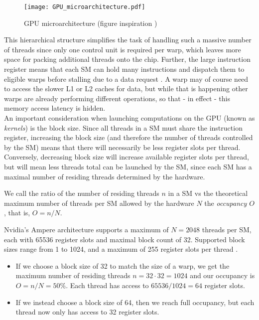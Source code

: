 \begin{figure}[ht]
    \centering
    \texttt{[image: GPU\_microarchitecture.pdf]}
    \caption{GPU microarchitecture (figure inspiration \cite*{solvercomp})}
    \label{fig:gpu}
\end{figure}

This hierarchical structure simplifies the task of handling such a massive number of 
threads since only one control unit is required per warp, which leaves more space for 
packing additional threads onto the chip. Further, the large instruction register means 
that each SM can hold many instructions and dispatch them to eligible warps before 
stalling due to a data request \cite*{solvercomp}. A warp may of course need to access 
the slower L1 or L2 caches for data, but while that is happening other warps are already 
performing different operations, so that - in effect - this memory access latency is 
hidden. \\

An important consideration when launching computations on the GPU (known as \emph{kernels}) 
is the block size. Since all threads in a SM must share the instruction register, 
increasing the block size (and therefore the number of threads controlled by the SM) means 
that there will necessarily be less register slots per thread. Conversely, decreasing 
block size will increase available register slots per thread, but will mean less threads 
total can be launched by the SM, since each SM has a maximal number of residing threads 
determined by the hardware. 

\begin{definition}
    We call the ratio of the number of residing threads $n$ in a SM vs the theoretical 
    maximum number of threads per SM allowed by the hardware $N$ the \emph{occupancy $O$}, 
    that is, $O = n / N$.
\end{definition}

\begin{example}
    Nvidia's Ampere architecture supports a maximum of $N = 2048$ threads per SM, each with 
    65536 register slots and maximal block count of 32. Supported block sizes range from 1 
    to 1024, and a maximum of 255 register slots per thread \cite*{ampere}. 

    \begin{itemize} 
        \item If we choose a block size of 32 to match the size of a warp, we get the 
        maximum number of residing threads $n = 32 \cdot 32 = 1024$ and our occupancy is 
        $O = n / N = 50\%$. Each thread has access to $65536 / 1024 = 64$ register slots. 
        \item If we instead choose a block size of 64, then we reach full occupancy, but 
        each thread now only has access to 32 register slots. 
    \end{itemize}

\end{example}

